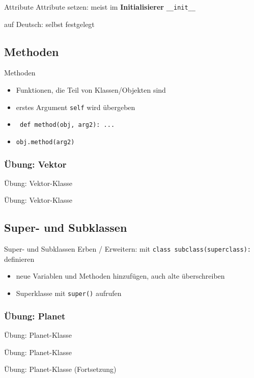 \begin{frame}{Attribute}
	Attribute setzen: meist im \textbf{Initialisierer} \alert{\tt \_\_init\_\_}
	
    auf Deutsch: selbst festgelegt
\end{frame}

\subsection{Methoden}
\begin{frame}{Methoden}
	\begin{itemize}
		\item Funktionen, die Teil von Klassen/Objekten sind
		\item<2-> erstes Argument \texttt{self} wird übergeben
        \item<3-> \texttt{    def method(obj, arg2): ...}
        \item<3-> \texttt{obj.method(arg2)}
	\end{itemize}
\end{frame}

\subsubsection{Übung: Vektor}
\begin{frame}{Übung: Vektor-Klasse}
    
    \end{frame}
\begin{frame}{Übung: Vektor-Klasse}
    
    \end{frame}

\subsection{Super- und Subklassen}
\begin{frame}{Super- und Subklassen}
	Erben / Erweitern: mit \alert{\tt class subclass(superclass):} definieren
	\begin{itemize}
		\item neue Variablen und Methoden hinzufügen, auch alte überschreiben
		\item Superklasse mit \alert{\tt super()} aufrufen
    \end{itemize}
	
\end{frame}
\subsubsection{Übung: Planet}
\begin{frame}{Übung: Planet-Klasse}
    
\end{frame}
\begin{frame}{Übung: Planet-Klasse}
    
\end{frame}
\begin{frame}{Übung: Planet-Klasse (Fortsetzung)}
    
\end{frame}

